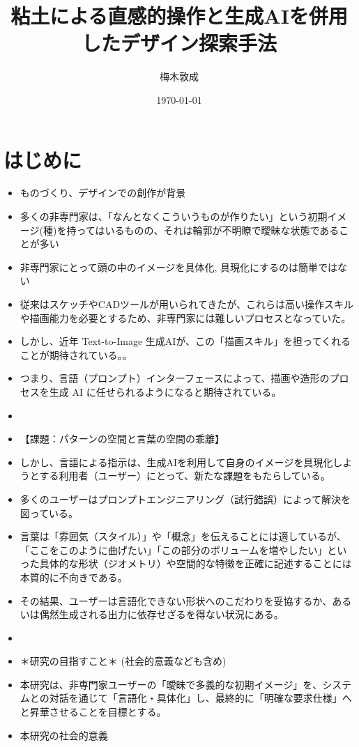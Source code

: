 \documentclass[dvipdfmx]{jlreq}
\title{粘土による直感的操作と生成AIを併用したデザイン探索手法}
\author{梅木敦成}
\date{\today}
\begin{document}
\maketitle


\section{はじめに}
\begin{itemize}
  \item ものづくり、デザインでの創作が背景
  \item 多くの非専門家は、「なんとなくこういうものが作りたい」という初期イメージ(種)を持ってはいるものの、それは輪郭が不明瞭で曖昧な状態であることが多い
  \item 非専門家にとって頭の中のイメージを具体化, 具現化にするのは簡単ではない
  \item 従来はスケッチやCADツールが用いられてきたが、これらは高い操作スキルや描画能力を必要とするため、非専門家には難しいプロセスとなっていた。
  \item しかし、近年 Text-to-Image 生成AIが、この「描画スキル」を担ってくれることが期待されている。。 
  \item つまり、言語（プロンプト）インターフェースによって、描画や造形のプロセスを生成 AI に任せられるようになると期待されている。
  \item 
  \item 【課題：パターンの空間と言葉の空間の乖離】
  \item しかし、言語による指示は、生成AIを利用して自身のイメージを具現化しようとする利用者（ユーザー）にとって、新たな課題をもたらしている。
  \item 多くのユーザーはプロンプトエンジニアリング（試行錯誤）によって解決を図っている。
  \item 言葉は「雰囲気（スタイル）」や「概念」を伝えることには適しているが、「ここをこのように曲げたい」「この部分のボリュームを増やしたい」といった具体的な形状（ジオメトリ）や空間的な特徴を正確に記述することには本質的に不向きである。
  \item その結果、ユーザーは言語化できない形状へのこだわりを妥協するか、あるいは偶然生成される出力に依存せざるを得ない状況にある。
  \item 
  \item ＊研究の目指すこと＊ (社会的意義なども含め)
  \item 本研究は、非専門家ユーザーの「曖昧で多義的な初期イメージ」を、システムとの対話を通じて「言語化・具体化」し、最終的に「明確な要求仕様」へと昇華させることを目標とする。
  \item 本研究の社会的意義

\end{itemize}
\end{document}

